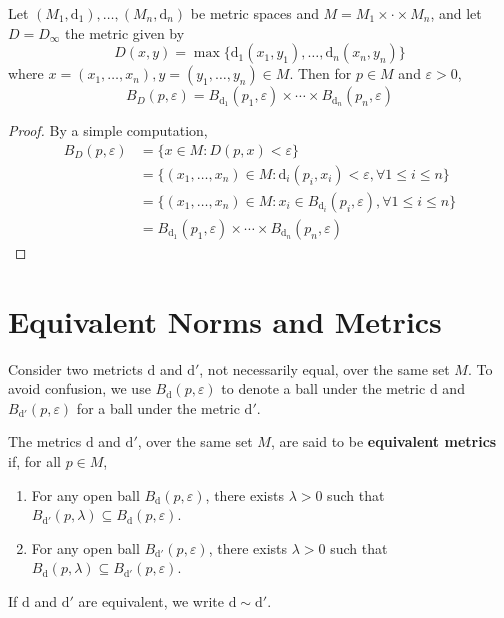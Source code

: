 \begin{proposition}
	Let $(M_1, \mathrm{d}_1), \ldots, (M_n, \mathrm{d}_n)$ be metric spaces and $M = M_1 \times \cdot \times M_n$, and let $D = D_\infty$ the metric given by 
	\[
		D(x,y) = \max \{ \mathrm{d}_1(x_1,y_1), \ldots, \mathrm{d}_n(x_n, y_n) \}
	\]
	where $x = (x_1, \ldots, x_n), y = (y_1, \ldots, y_n) \in M$. Then for $p \in M$ and $\varepsilon > 0$,
	\[
		B_D(p, \varepsilon) = B_{\mathrm{d}_1}(p_1, \varepsilon) \times \cdots \times B_{\mathrm{d}_n}(p_n, \varepsilon)
	\]
\end{proposition}

\begin{proof}
	By a simple computation,
	\begin{equation*}
		\begin{aligned}
			B_D(p, \varepsilon) &= \{ x \in M : D(p,x) < \varepsilon \} \\
								&= \{ (x_1, \ldots, x_n) \in M : \mathrm{d}_i(p_i, x_i) < \varepsilon, \forall 1 \leq i \leq n \} \\
								&= \{ (x_1, \ldots, x_n) \in M : x_i \in B_{\mathrm{d}_i}(p_i, \varepsilon), \forall 1 \leq i \leq n \} \\
								&= B_{\mathrm{d}_1}(p_1, \varepsilon) \times \cdots \times B_{\mathrm{d}_n}(p_n, \varepsilon)
		\end{aligned}
	\end{equation*}
\end{proof}

\section{Equivalent Norms and Metrics}

Consider two metricts $\mathrm{d}$ and $\mathrm{d}'$, not necessarily equal, over the same set $M$. To avoid confusion, we use $B_\mathrm{d}(p, \varepsilon)$ to denote a ball under the metric $\mathrm{d}$ and $B_{\mathrm{d}'}(p, \varepsilon)$ for a ball under the metric $\mathrm{d}'$.

\begin{definition}
	The metrics $\mathrm{d}$ and $\mathrm{d}'$, over the same set $M$, are said to be \textbf{equivalent metrics} if, for all $p \in M$,
	\begin{enumerate}
		\item For any open ball $B_\mathrm{d}(p, \varepsilon)$, there exists $\lambda > 0$ such that $B_{\mathrm{d}'}(p, \lambda) \subseteq B_\mathrm{d}(p, \varepsilon)$.
		\item For any open ball $B_{\mathrm{d}'}(p, \varepsilon)$, there exists $\lambda > 0$ such that $B_{\mathrm{d}}(p, \lambda) \subseteq B_{\mathrm{d}'}(p, \varepsilon)$.
	\end{enumerate}

	If $\mathrm{d}$ and $\mathrm{d}'$ are equivalent, we write $\mathrm{d} \sim \mathrm{d}'$.
\end{definition}

